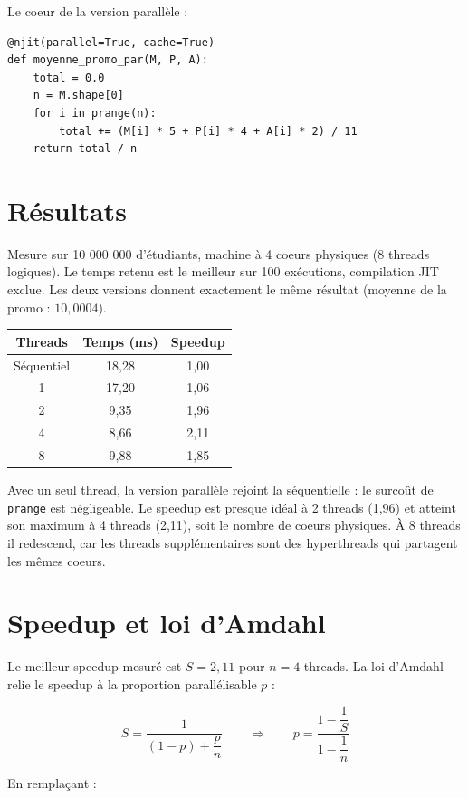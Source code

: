 \documentclass[11pt,a4paper]{article}
\begin{document}
Le coeur de la version parallèle :

\begin{verbatim}
@njit(parallel=True, cache=True)
def moyenne_promo_par(M, P, A):
    total = 0.0
    n = M.shape[0]
    for i in prange(n):
        total += (M[i] * 5 + P[i] * 4 + A[i] * 2) / 11
    return total / n
\end{verbatim}

\section{Résultats}

Mesure sur 10 000 000 d'étudiants, machine à 4 coeurs physiques (8 threads
logiques). Le temps retenu est le meilleur sur 100 exécutions, compilation JIT
exclue. Les deux versions donnent exactement le même résultat (moyenne de la
promo : $10{,}0004$).

\begin{center}
\begin{tabular}{ccc}
\toprule
Threads & Temps (ms) & Speedup \\
\midrule
Séquentiel & 18,28 & 1,00 \\
1 & 17,20 & 1,06 \\
2 & 9,35 & 1,96 \\
4 & 8,66 & 2,11 \\
8 & 9,88 & 1,85 \\
\bottomrule
\end{tabular}
\end{center}

Avec un seul thread, la version parallèle rejoint la séquentielle : le surcoût de
\texttt{prange} est négligeable. Le speedup est presque idéal à 2 threads (1,96)
et atteint son maximum à 4 threads (2,11), soit le nombre de coeurs physiques. À
8 threads il redescend, car les threads supplémentaires sont des hyperthreads qui
partagent les mêmes coeurs.

\section{Speedup et loi d'Amdahl}

Le meilleur speedup mesuré est $S = 2{,}11$ pour $n = 4$ threads. La loi d'Amdahl
relie le speedup à la proportion parallélisable $p$ :

\[
S = \frac{1}{(1 - p) + \dfrac{p}{n}}
\qquad\Longrightarrow\qquad
p = \frac{1 - \dfrac{1}{S}}{1 - \dfrac{1}{n}}
\]

En remplaçant :
\end{document}
